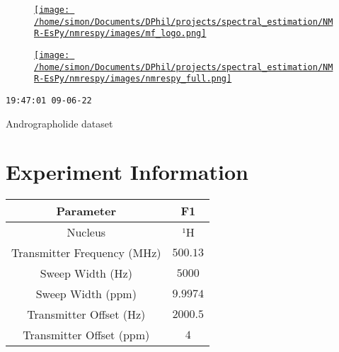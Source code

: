 \documentclass[8pt]{article}
\begin{document}
\begin{figure}[!ht]
\begin{minipage}[b][2.5cm][c]{.72\textwidth}
\href{http://foroozandeh.chem.ox.ac.uk/home}%
{\texttt{[image: /home/simon/Documents/DPhil/projects/spectral\_estimation/NMR-EsPy/nmrespy/images/mf\_logo.png]}}
\end{minipage}
\begin{minipage}[b][2.5cm][c]{.27\textwidth}
\href{https://foroozandehgroup.github.io/NMR-EsPy}%
{\texttt{[image: /home/simon/Documents/DPhil/projects/spectral\_estimation/NMR-EsPy/nmrespy/images/nmrespy\_full.png]}}
\end{minipage}
\end{figure}
\texttt{19:47:01 09-06-22}

Andrographolide dataset

\section*{Experiment Information}
\begin{longtable}[l]{c c}
\toprule
Parameter & F1\\
\midrule
Nucleus & ¹H\\
Transmitter Frequency (MHz) & $\num{500.13}$\\
Sweep Width (Hz) & $\num{5000}$\\
Sweep Width (ppm) & $\num{9.9974}$\\
Transmitter Offset (Hz) & $\num{2000.5}$\\
Transmitter Offset (ppm) & $\num{4}$\\
\bottomrule
\end{longtable}
\end{document}
